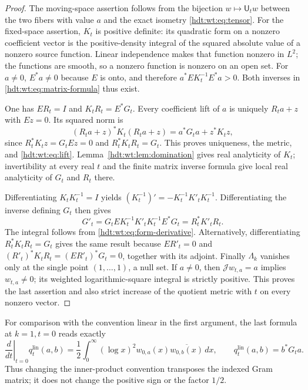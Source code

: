 \documentclass[11pt]{article}
\begin{document}
\begin{proof}
The moving-space assertion follows from the bijection
$w\mapsto\mathsf U_tw$ between the two fibers with value $a$
and the exact isometry \eqref{hdt:wt:eq:tensor}.
For the fixed-space assertion, $K_t$ is positive definite:
its quadratic form on a nonzero coefficient vector is the
positive-density integral of the squared absolute value of a
nonzero source function.  Linear independence makes that function
nonzero in $L^2$; the functions are smooth, so a nonzero function
is nonzero on an open set.  For $a\ne0$, $E^*a\ne0$ because
$E$ is onto, and therefore
$a^*EK_t^{-1}E^*a>0$.  Both inverses in
\eqref{hdt:wt:eq:matrix-formula} thus exist.

One has $ER_t=I$ and $K_tR_t=E^*G_t$.  Every coefficient lift
of $a$ is uniquely $R_ta+z$ with $Ez=0$.  Its squared norm is
\[
 (R_ta+z)^*K_t(R_ta+z)=a^*G_ta+z^*K_tz,
\]
since $R_t^*K_tz=G_tEz=0$ and
$R_t^*K_tR_t=G_t$.  This proves uniqueness, the metric, and
\eqref{hdt:wt:eq:lift}.  Lemma~\ref{hdt:wt:lem:domination} gives real
analyticity of $K_t$; invertibility at every real $t$ and the
finite matrix inverse formula give local real analyticity of
$G_t$ and $R_t$ there.

Differentiating $K_tK_t^{-1}=I$ yields
$(K_t^{-1})'=-K_t^{-1}K'_tK_t^{-1}$.  Differentiating the
inverse defining $G_t$ then gives
\[
 G'_t=G_tEK_t^{-1}K'_tK_t^{-1}E^*G_t=R_t^*K'_tR_t.
\]
The integral follows from \eqref{hdt:wt:eq:form-derivative}.
Alternatively, differentiating $R_t^*K_tR_t=G_t$ gives the
same result because $ER'_t=0$ and
$(R'_t)^*K_tR_t=(ER'_t)^*G_t=0$, together with its adjoint.
Finally $\Lambda_k$ vanishes only at the single point
$(1,\ldots,1)$, a null set.  If $a\ne0$, then
$\mathcal Jw_{t,a}=a$ implies $w_{t,a}\ne0$; its weighted
logarithmic-square integral is strictly positive.  This proves
the last assertion and also strict increase of the quotient
metric with $t$ on every nonzero vector.
\end{proof}

For comparison with the convention linear in the first argument,
the last formula at $k=1,t=0$ reads exactly
\begin{equation}\label{hdt:wt:eq:linear-first}
 \left.\frac d{dt}\right|_{t=0}q_t^{\mathrm{lin}}(a,b)
 =\frac12\int_0^\infty(\log x)^2w_{0,a}(x)
                         \overline{w_{0,b}(x)}\,dx,
 \qquad q_t^{\mathrm{lin}}(a,b)=b^*G_ta.
\end{equation}
Thus changing the inner-product convention transposes the indexed
Gram matrix; it does not change the positive sign or the factor
$1/2$.
\end{document}
